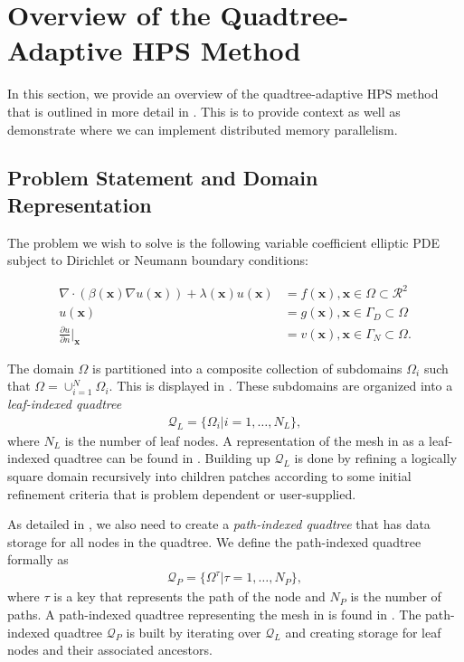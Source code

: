 \section{Overview of the Quadtree-Adaptive HPS Method}
\label{sec:overview-of-the-quadtree-adaptive-hps-method}

In this section, we provide an overview of the quadtree-adaptive HPS method that is outlined in more detail in \cite{chipman2024fast}. This is to provide context as well as demonstrate where we can implement distributed memory parallelism.

\subsection{Problem Statement and Domain Representation}
\label{sub:problem-statement-and-domain-representation}

The problem we wish to solve is the following variable coefficient elliptic PDE subject to Dirichlet or Neumann boundary conditions:

\begin{align}
    \label{eq:elliptic-pde}
    \nabla \cdot \left( \beta(\textbf{x}) \nabla u(\textbf{x}) \right) + \lambda(\textbf{x}) u(\textbf{x}) &= f(\textbf{x}), \textbf{x} \in \Omega \subset \mathcal{R}^2 \\
    \label{eq:elliptic-pde-bc1}
    u(\textbf{x}) &= g(\textbf{x}), \textbf{x} \in \Gamma_D \subset \Omega \\
    \label{eq:elliptic-pde-bc2}
    \frac{\partial u}{\partial n} \Big|_{\textbf{x}} &= v(\textbf{x}), \textbf{x} \in \Gamma_N \subset \Omega.
\end{align}

The domain $\Omega$ is partitioned into a composite collection of subdomains $\Omega_i$ such that $\Omega = \cup_{i = 1}^{N} \Omega_i$. This is displayed in . These subdomains are organized into a {\em leaf-indexed quadtree}
\begin{align}
    \mathcal{Q}_L = \{\Omega_i | i = 1, \dots, N_L\},
\end{align}
where $N_L$ is the number of leaf nodes. A representation of the mesh in  as a leaf-indexed quadtree can be found in . Building up $\mathcal{Q}_L$ is done by refining a logically square domain recursively into children patches according to some initial refinement criteria that is problem dependent or user-supplied.

As detailed in \cite{chipman2024fast}, we also need to create a {\em path-indexed quadtree} that has data storage for all nodes in the quadtree. We define the path-indexed quadtree formally as
\begin{align}
    \mathcal{Q}_P = \{\Omega^{\tau} | \tau = 1, \dots, N_P\},
\end{align}
where $\tau$ is a key that represents the path of the node and $N_P$ is the number of paths. A path-indexed quadtree representing the mesh in  is found in . The path-indexed quadtree $\mathcal{Q}_P$ is built by iterating over $\mathcal{Q}_L$ and creating storage for leaf nodes and their associated ancestors.

